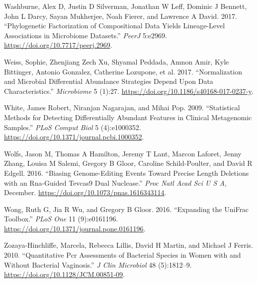 \documentclass[onecolumn]{book}
\theoremstyle{definition}
\theoremstyle{definition}
\theoremstyle{definition}
\theoremstyle{remark}
\begin{document}
\leavevmode\hypertarget{ref-Washburne:2017aa}{}%
Washburne, Alex D, Justin D Silverman, Jonathan W Leff, Dominic J
Bennett, John L Darcy, Sayan Mukherjee, Noah Fierer, and Lawrence A
David. 2017. ``Phylogenetic Factorization of Compositional Data Yields
Lineage-Level Associations in Microbiome Datasets.'' \emph{PeerJ}
5:e2969. \url{https://doi.org/10.7717/peerj.2969}.

\leavevmode\hypertarget{ref-Weiss:2017aa}{}%
Weiss, Sophie, Zhenjiang Zech Xu, Shyamal Peddada, Amnon Amir, Kyle
Bittinger, Antonio Gonzalez, Catherine Lozupone, et al. 2017.
``Normalization and Microbial Differential Abundance Strategies Depend
Upon Data Characteristics.'' \emph{Microbiome} 5 (1):27.
\url{https://doi.org/10.1186/s40168-017-0237-y}.

\leavevmode\hypertarget{ref-White:2009}{}%
White, James Robert, Niranjan Nagarajan, and Mihai Pop. 2009.
``Statistical Methods for Detecting Differentially Abundant Features in
Clinical Metagenomic Samples.'' \emph{PLoS Comput Biol} 5 (4):e1000352.
\url{https://doi.org/10.1371/journal.pcbi.1000352}.

\leavevmode\hypertarget{ref-Wolfs:2016aa}{}%
Wolfs, Jason M, Thomas A Hamilton, Jeremy T Lant, Marcon Laforet, Jenny
Zhang, Louisa M Salemi, Gregory B Gloor, Caroline Schild-Poulter, and
David R Edgell. 2016. ``Biasing Genome-Editing Events Toward Precise
Length Deletions with an Rna-Guided Tevcas9 Dual Nuclease.'' \emph{Proc
Natl Acad Sci U S A}, December.
\url{https://doi.org/10.1073/pnas.1616343114}.

\leavevmode\hypertarget{ref-Wong:2016aa}{}%
Wong, Ruth G, Jia R Wu, and Gregory B Gloor. 2016. ``Expanding the
UniFrac Toolbox.'' \emph{PLoS One} 11 (9):e0161196.
\url{https://doi.org/10.1371/journal.pone.0161196}.

\leavevmode\hypertarget{ref-Zozaya:2010}{}%
Zozaya-Hinchliffe, Marcela, Rebecca Lillis, David H Martin, and Michael
J Ferris. 2010. ``Quantitative Pcr Assessments of Bacterial Species in
Women with and Without Bacterial Vaginosis.'' \emph{J Clin Microbiol} 48
(5):1812--9. \url{https://doi.org/10.1128/JCM.00851-09}.
\end{document}
